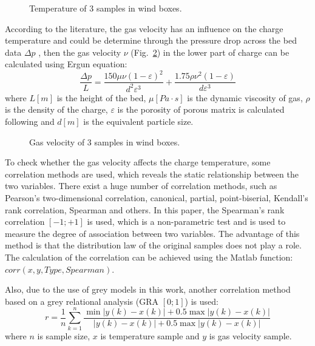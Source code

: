 \documentclass[AMS,STIX2COL]{WileyNJD-v2}
\begin{document}
\begin{figure}[htbp]
	\centering
	\caption{Temperature of 3 samples in wind boxes.} \label{TempCurves}
\end{figure}  
According to the literature, the gas velocity has an influence  on the charge temperature and could be determine through the pressure drop across the bed data $\Delta p$ , then the gas velocity $\nu$ (Fig.~\ref{VelocCurves}) in the lower part of charge can be calculated using Ergun equation:
\begin{equation} \label{eq:Ergun}
\frac{\Delta p}{L}=\frac{150\mu \nu(1-\varepsilon)^2}{d^2\varepsilon^3}+
\frac{1.75\rho \nu^2(1-\varepsilon)}{d\varepsilon^3}
\end{equation}
where $L [m]$ is the height of the bed, $\mu [Pa\cdot s]$ is the dynamic viscosity of gas, $\rho$ is the density of the charge, $\varepsilon$ is the porosity of porous matrix is calculated following \cite{Kaymak2017} and $d [m]$  is the equivalent particle size. 

\begin{figure}[htbp]
	\centering
	\caption{Gas velocity of 3 samples in wind boxes.} \label{VelocCurves}
\end{figure}  

To check whether the gas velocity affects the charge temperature, some correlation methods are used, which reveals the static relationship between the two variables. There exist a huge number of correlation methods, such as Pearson's two-dimensional correlation, canonical, partial, point-biserial, Kendall's rank correlation, Spearman and others. In this paper, the Spearman's rank correlation $[-1;+1]$ is used, which is a non-parametric test and is used to measure the degree of association between two variables. The advantage of this method is that the distribution law of the original samples does not play a role. The calculation of the correlation can be achieved using the Matlab function: $corr(x, y, Type, Spearman)$. 

Also, due to the use of grey models in this work, another correlation method based on a grey relational analysis (GRA $[0; 1]$) is used:
\begin{equation}
r=\frac{1}{n}\sum_{k=1}^{n}\frac{\min\limits|y(k)-x(k)|+
	0.5\max\limits|y(k)-x(k)|}{|y(k)-x(k)|+0.5\max\limits|y(k)-x(k)|}
\end{equation}
where $n$ is sample size, $x$ is temperature sample and $y$ is gas velocity sample.
\end{document}
